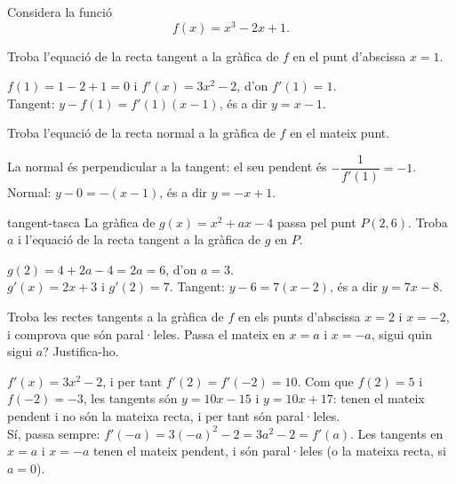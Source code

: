 Considera la funció
\[
f(x)=x^3-2x+1 .
\]

\begin{apartats}

Troba l'equació de la recta tangent a la gràfica de $f$ en el punt d'abscissa $x=1$.

\begin{solucio}
$f(1)=1-2+1=0$ i $f'(x)=3x^2-2$, d'on $f'(1)=1$.\\
Tangent: $y-f(1)=f'(1)(x-1)$, és a dir $y=x-1$.
\end{solucio}

\begin{nomesllarg}
Troba l'equació de la recta normal a la gràfica de $f$ en el mateix punt.

\begin{solucio}
La normal és perpendicular a la tangent: el seu pendent és $-\dfrac{1}{f'(1)}=-1$.\\
Normal: $y-0=-(x-1)$, és a dir $y=-x+1$.
\end{solucio}
\end{nomesllarg}

\begin{tria}{tangent-tasca}
La gràfica de $g(x)=x^2+ax-4$ passa pel punt $P(2,6)$. Troba $a$ i l'equació de la recta
tangent a la gràfica de $g$ en $P$.

\begin{solucio}
$g(2)=4+2a-4=2a=6$, d'on $\boxed{a=3}$.\\
$g'(x)=2x+3$ i $g'(2)=7$. Tangent: $y-6=7(x-2)$, és a dir $y=7x-8$.
\end{solucio}

Troba les rectes tangents a la gràfica de $f$ en els punts d'abscissa $x=2$ i $x=-2$, i comprova
que són paral·leles. Passa el mateix en $x=a$ i $x=-a$, sigui quin sigui $a$? Justifica-ho.

\begin{solucio}
$f'(x)=3x^2-2$, i per tant $f'(2)=f'(-2)=10$. Com que $f(2)=5$ i $f(-2)=-3$, les tangents són
$y=10x-15$ i $y=10x+17$: tenen el mateix pendent i no són la mateixa recta, i per tant són
paral·leles.\\
Sí, passa sempre: $f'(-a)=3(-a)^2-2=3a^2-2=f'(a)$. Les tangents en $x=a$ i $x=-a$ tenen el
mateix pendent, i són paral·leles (o la mateixa recta, si $a=0$).
\end{solucio}
\end{tria}

\end{apartats}
